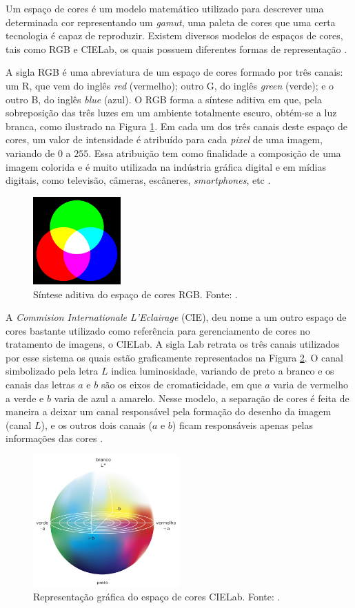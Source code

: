 Um espaço de cores é um modelo matemático utilizado para descrever uma determinada cor representando um \emph{gamut}, uma paleta de cores que uma certa tecnologia é capaz de reproduzir. Existem diversos modelos de espaços de cores, tais como RGB e CIELab, os quais possuem diferentes  formas de representação \cite{ref:galleti}.

A sigla RGB é uma abreviatura de um espaço de cores formado por três canais: um R, que vem do inglês \emph{red} (vermelho); outro G, do inglês \emph{green} (verde); e o outro B, do inglês \emph{blue} (azul). O RGB forma a síntese aditiva em que, pela sobreposição das três luzes em um ambiente totalmente escuro, obtém-se a luz branca, como ilustrado na Figura \ref{fig:rgb}. Em cada um dos três canais deste espaço de cores, um valor de intensidade é atribuído para cada \emph{pixel} de uma imagem, variando de $0$ a $255$. Essa atribuição tem como finalidade a composição de uma imagem colorida e é muito utilizada na indústria gráfica digital e em mídias digitais, como televisão, câmeras, escâneres, \emph{smartphones}, etc \cite{ref:galleti}.

\begin{figure}[h]
	\centering
	\caption{Síntese aditiva do espaço de cores RGB. Fonte: \cite{ref:galleti}.}
	\label{fig:rgb}
	\includegraphics[width=0.3\textwidth]{./img/rgb}
\end{figure}


A \emph{Commision Internationale L'Eclairage} (CIE), deu nome a um outro espaço de cores bastante utilizado como referência para gerenciamento de cores no tratamento de imagens, o CIELab. A sigla Lab retrata os três canais utilizados por esse sistema os quais estão graficamente representados na Figura \ref{fig:cielab}. O canal simbolizado pela letra $L$ indica luminosidade, variando de preto a branco e os canais das letras $a$ e $b$ são os eixos de cromaticidade, em que $a$ varia de vermelho a verde e $b$ varia de azul a amarelo. Nesse modelo, a separação de cores é feita de maneira a deixar um canal responsável pela formação do desenho da imagem (canal $L$), e os outros dois canais ($a$ e $b$) ficam responsáveis apenas pelas informações das cores \cite{ref:galleti}.

\begin{figure}[h]
	\centering
	\caption{Representação gráfica do espaço de cores CIELab. Fonte: \cite{ref:galleti}.}
	\label{fig:cielab}
	\includegraphics[width=0.5\textwidth]{./img/cielab}
\end{figure}

